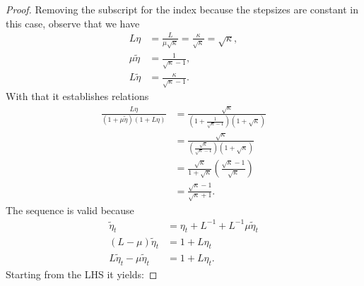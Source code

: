 \documentclass[12pt]{article}
\begin{document}
        \begin{proof}
            
            Removing the subscript for the index because the stepsizes are constant in this case, observe that we have 
            $$
            \begin{aligned}
                L\eta &= \frac{L}{\mu \sqrt{\kappa}} = \frac{\kappa}{\sqrt{\kappa}} = \sqrt{\kappa}, 
                \\
                \mu \tilde \eta &= 
                \frac{1}{\sqrt{\kappa} - 1}, 
                \\
                L\tilde \eta &= 
                \frac{\kappa}{\sqrt{\kappa} - 1}. 
            \end{aligned}
            $$
            With that it establishes relations
            $$
            \begin{aligned}
                \frac{L\eta }{(1 + \mu \tilde \eta)(1 + L\eta)}
                &= 
                \frac{\sqrt{\kappa}}{
                    \left(
                        1 + \frac{1}{\sqrt{\kappa} - 1}
                    \right)
                    \left(
                        1 + \sqrt{\kappa}
                    \right)
                }
                \\
                &= \frac{\sqrt{\kappa}}{
                    \left(
                        \frac{\sqrt{\kappa}}{\sqrt{\kappa} - 1}
                    \right)(1 + \sqrt{\kappa})
                }
                \\
                &=
                \frac{\sqrt{\kappa}}{1 + \sqrt{\kappa}}\left(
                    \frac{\sqrt{\kappa} - 1}{\sqrt{\kappa}}
                \right)
                \\
                &= 
                \frac{\sqrt{\kappa} - 1}{\sqrt{\kappa} + 1}. 
            \end{aligned}
            $$
            The sequence is valid because 
            $$
            \begin{aligned}
                \tilde \eta_{t} 
                &= \eta_t + L^{-1} + L^{-1} \mu \tilde \eta_{t}
                \\
                (L - \mu)\tilde \eta_{t}
                &= 
                1 + L \eta_t 
                \\
                L \tilde \eta_{t} - 
                \mu \tilde \eta_{t}
                &= 1 + L \eta_t. 
            \end{aligned}
            $$
            Starting from the LHS it yields: 

\end{proof}
\end{document}
